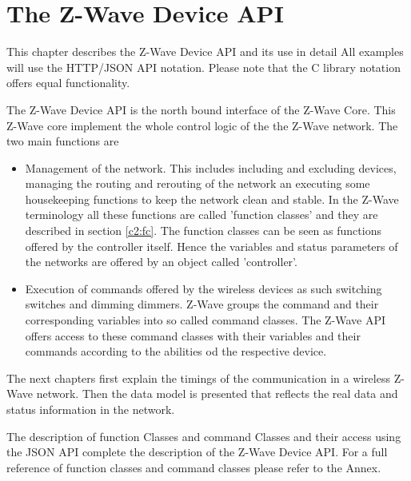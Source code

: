 \chapter{The Z-Wave Device API}
\label{c2}

This chapter describes the Z-Wave Device API and its use in detail All examples will use
the HTTP/JSON API notation. Please note that the C library notation offers equal 
functionality.

The Z-Wave Device API is the north bound interface of the Z-Wave Core. This Z-Wave core
implement the whole control logic of the the Z-Wave network. The two main functions are
\begin{itemize}
\item Management of the network. This includes including and excluding devices, managing 
the routing and rerouting of the network  an executing some housekeeping functions 
to keep the network clean and stable. In the Z-Wave terminology all these functions 
are called 'function classes' and they are described in section \ref{c2:fc}. The function 
classes can be seen as functions offered by the controller itself. Hence the variables
and status parameters of the networks are offered by an object called 'controller'.

\item Execution of commands offered by the wireless devices as such switching switches 
and dimming dimmers. Z-Wave groups the command and their corresponding variables into
so called command classes. The Z-Wave API offers access to these command classes with
their variables and their commands according to the abilities od the respective device.
\end{itemize}
The next chapters first explain the timings of the communication in a wireless 
Z-Wave network. Then the data model is presented that reflects the real data and status 
information in the network.

The description of function Classes and command Classes and their access 
using the JSON API  complete the description of the Z-Wave Device API. For a full 
reference of function classes and command classes please refer to the Annex. 
